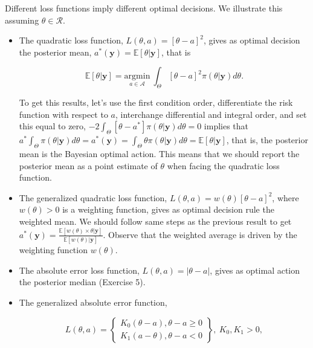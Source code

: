 Different loss functions imply different optimal decisions. We illustrate this assuming $\theta \in \mathcal{R}$.

\begin{itemize}
	\item The quadratic loss function, $L({\theta},a)=[{\theta}-a]^2$, gives as optimal decision the posterior mean, $a^*(\mathbf{y})=\mathbb{E}[{\theta}|\mathbf{y}]$, that is 
		
	\begin{equation*}
		\mathbb{E}[{\theta}|\mathbf{y}] = \underset{a \in \mathcal{A}}{\mathrm{argmin}} \  \int_{{\Theta}} [{\theta}-a]^2\pi({\theta}|\mathbf{y})d{\theta}.
	\end{equation*}
	
	To get this results, let's use the first condition order, differentiate the risk function with respect to $a$, interchange differential and integral order, and set this equal to zero, $-2\int_{{\Theta}} [{\theta}-a^*]\pi({\theta}|\mathbf{y})d{\theta}=0$ implies that $a^*\int_{{\Theta}} \pi({\theta}|\mathbf{y})d{\theta}=a^*(\mathbf{y})=\int_{{\Theta}} {\theta}\pi({\theta}|\mathbf{y})d{\theta}=\mathbb{E}[{\theta}|\mathbf{y}]$, that is, the posterior mean is the Bayesian optimal action. This means that we should report the posterior mean as a point estimate of $\theta$ when facing the quadratic loss function.
	
	\item The generalized quadratic loss function,  $L({\theta},a)=w({\theta})[{\theta}-a]^2$, where $w({\theta})>0$ is a weighting function, gives as optimal decision rule the weighted mean. We should follow same steps as the previous result to get   $a^*(\mathbf{y})=\frac{\mathbb{E}[w({\theta})\times{\theta}|\mathbf{y}]}{\mathbb{E}[w({\theta})|\mathbf{y}]}$. Observe that the weighted average is driven by the weighting function $w({\theta})$.
	
	\item The absolute error loss function, $L({\theta},a)=|{\theta}-a|$, gives as optimal action the posterior median (Exercise 5).
	
	\item The generalized absolute error function,
	
	\begin{equation*}
		L(\theta,a)=\begin{Bmatrix} K_0(\theta-a), \theta-a\geq 0\\
			K_1(a-\theta), \theta-a < 0 \end{Bmatrix}, \ K_0,K_1>0,
	\end{equation*}
	

\end{itemize}
